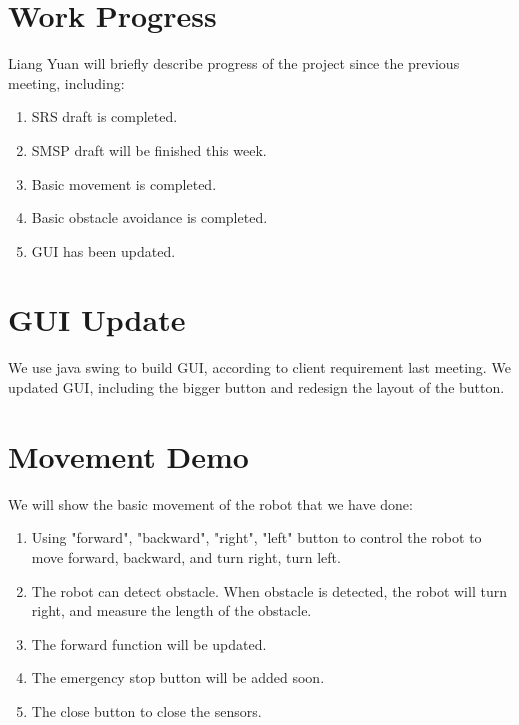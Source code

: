 \documentclass[11pt, a4paper]{article}
\begin{document}


\section{Work Progress}

Liang Yuan will briefly describe progress of the project since the previous meeting, including:

\begin{enumerate}

\item SRS draft is completed.
 
\item SMSP draft will be finished this week.

\item Basic movement is completed.

\item Basic obstacle avoidance is completed.

\item GUI has been updated.

\end{enumerate}

\section{GUI Update}

We use java swing to build GUI, according to client requirement last meeting. We updated GUI, including the bigger button and redesign the layout of the button.

\section{Movement Demo}

We will show the basic movement of the robot that we have done:

\begin{enumerate}

\item Using "forward", "backward", "right", "left" button to control the robot to move forward, backward, and turn right, turn left.

\item The robot can detect obstacle. When obstacle is detected, the robot will turn right, and measure the length of the obstacle.

\item The forward function will be updated.

\item The emergency stop button will be added soon.

\item The close button to close the sensors.

\end{enumerate}
 
\end{document}
